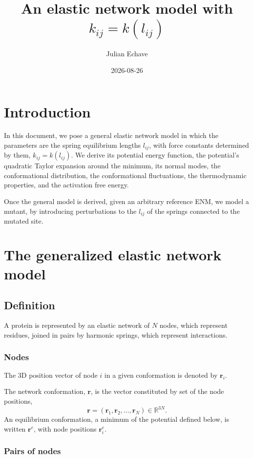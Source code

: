 \documentclass[11pt]{article}
\title{An elastic network model with $k_{ij}=k(l_{ij})$}
\author{Julian Echave}
\date{2026-08-26}
\newcommand{\rr}{\mathbf{r}}
\newcommand{\re}{\rr^{e}}
\newcommand{\lij}{l_{ij}}
\newcommand{\kij}{k_{ij}}
\begin{document}
\maketitle

\section{Introduction}

In this document,  we pose a general elastic network model in which the parameters are the spring equilibrium lengths $\lij$, with force constants determined by them, $\kij = k(\lij)$. We derive its potential energy function, the potential's quadratic Taylor expansion around the minimum, its normal modes, the conformational distribution, the conformational fluctuations, the thermodynamic properties, and the activation free energy.

Once the general model is derived, given an arbitrary reference ENM, we model a mutant, by introducing perturbations to the $\lij$ of the springs connected to the mutated site.


\section{The generalized elastic network model}
\label{sec:model}

\subsection{Definition}

A protein is represented by an elastic network of $N$ nodes, which represent residues, joined in pairs by harmonic springs, which represent interactions.

\subsubsection{Nodes}

The 3D position vector of node $i$ in a given conformation is denoted by $\rr_i$. 

The network conformation, $\rr$, is the vector constituted by set of the node positions,
\begin{equation}
\rr = (\rr_1, \rr_2, \ldots, \rr_N) \in \mathbb{R}^{3N}.
\end{equation}
An equilibrium conformation, a minimum of the potential defined below, is written $\re$, with node positions $\re_i$.

\subsubsection{Pairs of nodes}
\end{document}
